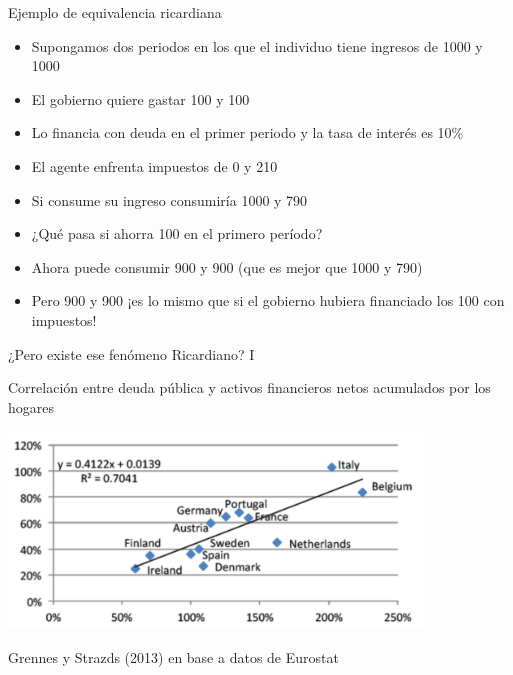 \documentclass{beamer}
\begin{document}
\begin{frame}{Ejemplo de equivalencia ricardiana}
    
\begin{itemize}
    \item Supongamos dos periodos en los que el individuo tiene ingresos de 1000 y 1000
    \item El gobierno quiere gastar 100 y 100 
    \item Lo financia con deuda en el primer periodo y la tasa de interés es 10\%
    \item El agente enfrenta impuestos de 0 y 210
    \item Si consume su ingreso consumiría 1000 y 790 
    \item ¿Qué pasa si ahorra 100 en el primero período?
    \item Ahora puede consumir 900 y 900 (que es mejor que 1000 y 790)
    \item Pero 900 y 900 ¡es lo mismo que si el gobierno hubiera financiado los 100 con impuestos! 
\end{itemize}

\end{frame}


\begin{frame}{¿Pero existe ese fenómeno Ricardiano? I}

     \begin{center}
         Correlación entre deuda pública y activos financieros netos acumulados por los hogares
     \end{center}

     \centering\includegraphics[width=11cm]{Slides Principios de Economia/P91b.png}\  

     \begin{center}
         Grennes y Strazds (2013) en base a datos de Eurostat
     \end{center}

\end{frame}
\end{document}
